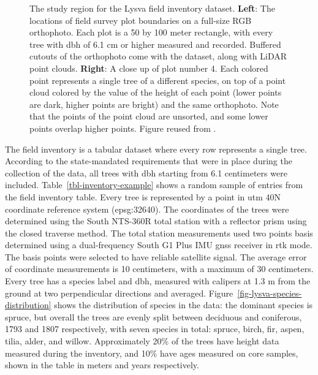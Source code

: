 \begin{figure}
\caption[The study region for the Lysva field inventory.]{\label{fig-lysva-roi}The study region for the Lysva field
inventory dataset. \textbf{Left}: The locations of field survey plot
boundaries on a full-size RGB orthophoto. Each plot is a 50 by 100 meter
rectangle, with every tree with dbh of 6.1 cm or higher measured and recorded. Buffered
cutouts of the orthophoto come with the dataset, along with LiDAR point
clouds. \textbf{Right}: A close up of plot number 4. Each colored point
represents a single tree of a different species, on top of a point cloud
colored by the value of the height of each point (lower points are dark,
higher points are bright) and the same orthophoto.
Note that the points of the point cloud are unsorted, and some lower points overlap higher points.
Figure reused from \citet{dubrovinOpenDatasetIndividual2024}.}
\end{figure}


The field inventory is a tabular dataset where every row represents a single tree.
According to the state-mandated requirements that were in place during the collection of the data, all trees with \gls{dbh} starting from 6.1 centimeters were included.
Table~\ref{tbl-inventory-example} shows a random sample of entries from the field inventory table.
Every tree is represented by a point in \gls{utm} 40N coordinate reference system (\gls{epsg}:32640).
The coordinates of the trees were determined using the South NTS-360R total station with a reflector prism using the closed traverse method.
The total station measurements used two points basis determined using a dual-frequency South G1 Plus IMU \gls{gnss} receiver in \gls{rtk} mode.
The basis points were selected to have reliable satellite signal.
The average error of coordinate measurements is 10 centimeters, with a maximum of 30 centimeters.
Every tree has a species label and \acrfull{dbh}, measured with calipers at 1.3 m from the ground at two perpendicular directions and averaged.
Figure~\ref{fig-lysva-species-distribution} shows the distribution of species in the data: the dominant species is spruce, but overall the trees are evenly split between deciduous and coniferous, 1793 and 1807 respectively, with seven species in total: spruce, birch, fir, aspen, tilia, alder, and willow.
Approximately 20\% of the trees have height data measured during the inventory, and 10\% have ages measured on core samples, shown in the table in meters and years respectively.


